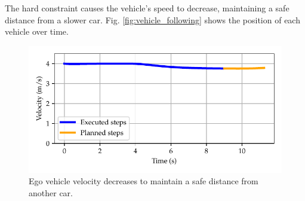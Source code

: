 \documentclass[letterpaper, 10 pt, conference]{ieeeconf}  %
\begin{document}
The hard constraint causes the vehicle's speed to decrease, maintaining a safe distance from a slower car. Fig. \ref{fig:vehicle_following} shows the position of each vehicle over time.
 
 \begin{figure}[h!]
	\centering
	\includegraphics[width=0.9\linewidth]{figures/vehicle_following_velocity.pdf}
	 	\vspace{-1em}
	\caption{Ego vehicle velocity decreases to maintain a safe distance from another car.}		\label{fig:vehicle_following_velocity}
\end{figure}
\end{document}
